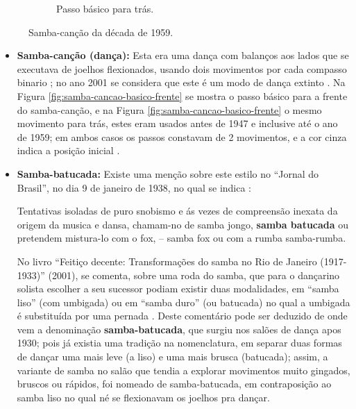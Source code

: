 \begin{figure}[h]
\begin{subfigure}[b]{0.65\textwidth}
        \caption{Passo básico para trás.}
        \label{fig:samba-cancao-basico-tras}
    \end{subfigure}
    \caption{Samba-canção da década de 1959.}\label{fig:samba-cancao-basico}
\end{figure}

\begin{itemize}

\item \textbf{Samba-canção (dança):}
Esta era uma dança com balanços aos lados que se executava de joelhos flexionados,
usando dois movimentos por cada compasso binario \cite[pp. 58]{freitas1959danca} 
\cite[pp. 51]{fornaciari1947aprender} \cite[pp. 143]{perna2002samba}; 
no ano 2001 se considera que este é um modo de dança extinto \cite[pp. 143]{perna2002samba}. %
Na Figura \ref{fig:samba-cancao-basico-frente} se mostra o passo básico para a frente do samba-canção,
e na  Figura \ref{fig:samba-cancao-basico-frente} o mesmo movimento para trás,
estes eram usados antes de 1947 e inclusive até o ano de 1959;
em ambos casos os passos constavam de 2 movimentos, e a cor cinza indica a posição inicial \cite[pp. 51]{fornaciari1947aprender} \cite[pp. 59-60]{freitas1959danca}. 



\item \textbf{Samba-batucada:}
Existe uma menção sobre este estilo no ``Jornal do Brasil'', no dia 9 de janeiro de 1938,
no qual se indica \cite[pp. 4]{musicasambavariasdef1}:
\begin{citando}%
Tentativas isoladas de puro 
snobismo e ás vezes de compreensão 
inexata da origem da 
musica e dansa, chamam-no de samba jongo, \textbf{samba batucada} ou
pretendem mistura-lo com o fox, -- samba fox ou com a rumba samba-rumba.
\end{citando}



No livro ``Feitiço decente: Transformações do samba no Rio de Janeiro (1917-1933)'' (2001),
se comenta, sobre uma roda do samba, que para o dançarino solista  escolher a seu sucessor podiam
existir duas modalidades, em ``samba liso'' (com umbigada) ou em ``samba duro'' 
(ou batucada) no qual a umbigada é substituída por uma pernada \cite[pp. 109]{sandroni2001feitico}.
Deste comentário pode ser deduzido de onde vem a denominação \textbf{samba-batucada}, 
que surgiu nos salões de dança apos 1930; pois já existia uma tradição na nomenclatura,
em separar duas formas de dançar uma mais leve (a liso) e uma mais brusca (batucada);
assim, a variante de samba no salão que tendia a explorar movimentos muito  gingados, bruscos ou rápidos,
foi nomeado de samba-batucada, em contraposição ao samba liso no qual né se flexionavam os joelhos pra dançar.  




\end{itemize}
